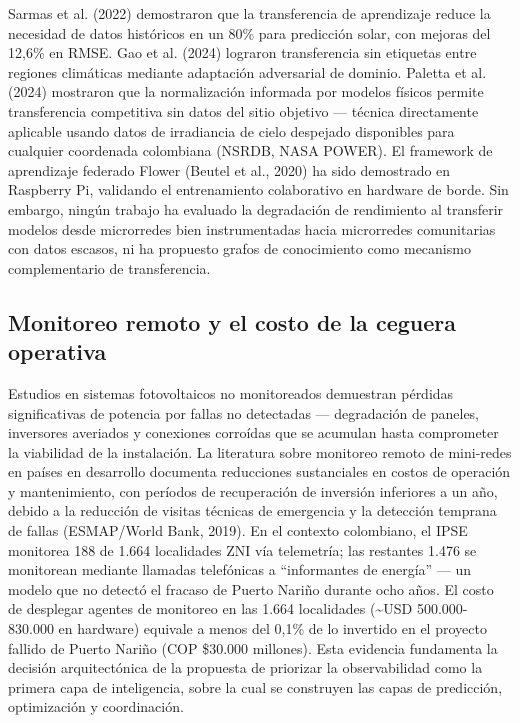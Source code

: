 \documentclass[12pt,letterpaper]{article}
\begin{document}
Sarmas et al. (2022) demostraron que la transferencia de aprendizaje reduce la necesidad de datos hist\'oricos en un 80\% para predicci\'on solar, con mejoras del 12,6\% en RMSE. Gao et al. (2024) lograron transferencia sin etiquetas entre regiones clim\'aticas mediante adaptaci\'on adversarial de dominio. Paletta et al. (2024) mostraron que la normalizaci\'on informada por modelos f\'isicos permite transferencia competitiva sin datos del sitio objetivo --- t\'ecnica directamente aplicable usando datos de irradiancia de cielo despejado disponibles para cualquier coordenada colombiana (NSRDB, NASA POWER). El framework de aprendizaje federado Flower (Beutel et al., 2020) ha sido demostrado en Raspberry Pi, validando el entrenamiento colaborativo en hardware de borde. Sin embargo, ning\'un trabajo ha evaluado la degradaci\'on de rendimiento al transferir modelos desde microrredes bien instrumentadas hacia microrredes comunitarias con datos escasos, ni ha propuesto grafos de conocimiento como mecanismo complementario de transferencia.

\subsection*{Monitoreo remoto y el costo de la ceguera operativa}

Estudios en sistemas fotovoltaicos no monitoreados demuestran p\'erdidas significativas de potencia por fallas no detectadas --- degradaci\'on de paneles, inversores averiados y conexiones corro\'idas que se acumulan hasta comprometer la viabilidad de la instalaci\'on. La literatura sobre monitoreo remoto de mini-redes en pa\'ises en desarrollo documenta reducciones sustanciales en costos de operaci\'on y mantenimiento, con per\'iodos de recuperaci\'on de inversi\'on inferiores a un a\~no, debido a la reducci\'on de visitas t\'ecnicas de emergencia y la detecci\'on temprana de fallas (ESMAP/World Bank, 2019). En el contexto colombiano, el IPSE monitorea 188 de 1.664 localidades ZNI v\'ia telemetr\'ia; las restantes 1.476 se monitorean mediante llamadas telef\'onicas a ``informantes de energ\'ia'' --- un modelo que no detect\'o el fracaso de Puerto Nari\~no durante ocho a\~nos. El costo de desplegar agentes de monitoreo en las 1.664 localidades (\textasciitilde USD 500.000-830.000 en hardware) equivale a menos del 0,1\% de lo invertido en el proyecto fallido de Puerto Nari\~no (COP \$30.000 millones). Esta evidencia fundamenta la decisi\'on arquitect\'onica de la propuesta de priorizar la observabilidad como la primera capa de inteligencia, sobre la cual se construyen las capas de predicci\'on, optimizaci\'on y coordinaci\'on.
\end{document}
